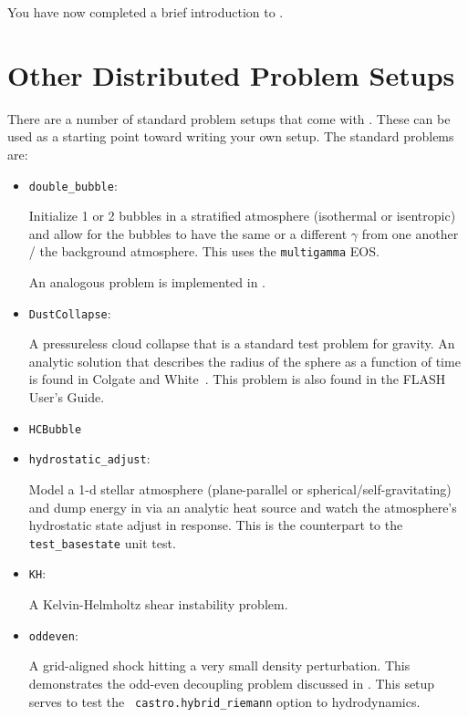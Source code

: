 You have now completed a brief introduction to \castro. 


\section{Other Distributed Problem Setups}

There are a number of standard problem setups that come with \castro.
These can be used as a starting point toward writing your own setup.
The standard problems are:
\begin{itemize}

\item {\tt double\_bubble}:

  Initialize 1 or 2 bubbles in a stratified atmosphere (isothermal or
  isentropic) and allow for the bubbles to have the same or a
  different $\gamma$ from one another / the background atmosphere.  This
  uses the {\tt multigamma} EOS.

  An analogous problem is implemented in \maestro.
    
\item {\tt DustCollapse}:

  A pressureless cloud collapse that is a standard test problem for
  gravity.  An analytic solution that describes the radius of the
  sphere as a function of time is found in Colgate and
  White~\cite{colgwhite}.  This problem is also found in the FLASH
  User's Guide.
  
  
\item {\tt HCBubble}
  
\item {\tt hydrostatic\_adjust}:

  Model a 1-d stellar atmosphere (plane-parallel or
  spherical/self-gravitating) and dump energy in via an analytic heat
  source and watch the atmosphere's hydrostatic state adjust in
  response.  This is the counterpart to the \maestro\ {\tt
    test\_basestate} unit test.

\item {\tt KH}:

  A Kelvin-Helmholtz shear instability problem.
  
\item {\tt oddeven}:

  A grid-aligned shock hitting a very small density perturbation.
  This demonstrates the odd-even decoupling problem discussed in
  \cite{quirk1997}.  This setup serves to test the {\tt
    castro.hybrid\_riemann} option to hydrodynamics.
  

\end{itemize}
